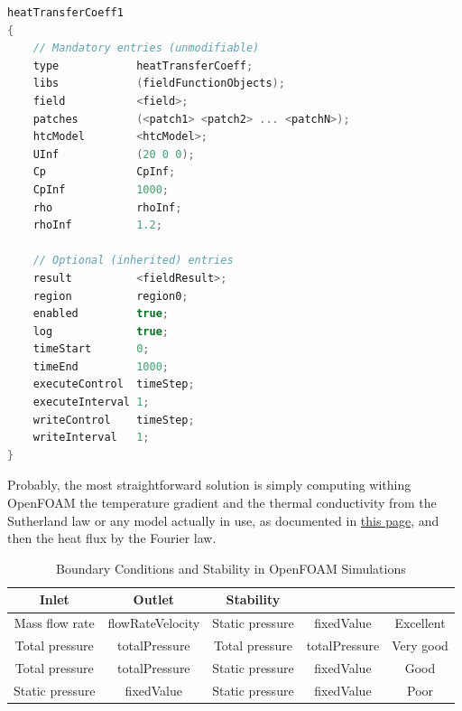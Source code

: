 \documentclass[12pt]{article}
\begin{document}
\begin{lstlisting}[caption={heatTransferCoeff1 Configuration.}, label={lst:heatTransferCoeff1}, language=C++]
heatTransferCoeff1
{
    // Mandatory entries (unmodifiable)
    type            heatTransferCoeff;
    libs            (fieldFunctionObjects);
    field           <field>;
    patches         (<patch1> <patch2> ... <patchN>);
    htcModel        <htcModel>;
    UInf            (20 0 0);
    Cp              CpInf;
    CpInf           1000;
    rho             rhoInf;
    rhoInf          1.2;

    // Optional (inherited) entries
    result          <fieldResult>;
    region          region0;
    enabled         true;
    log             true;
    timeStart       0;
    timeEnd         1000;
    executeControl  timeStep;
    executeInterval 1;
    writeControl    timeStep;
    writeInterval   1;
}
\end{lstlisting}

Probably, the most straightforward solution is simply computing withing OpenFOAM the temperature gradient and the thermal conductivity from the Sutherland law or any model actually in use, as documented in \href{https://www.openfoam.com/documentation/user-guide/5-models-and-physical-properties/5.2-thermophysical-models}{this page}, and then the heat flux by the Fourier law.

\begin{table}[H]
    \centering
    \begin{tabular}{ccccc}
        \hline
        \textbf{Inlet} & \textbf{Outlet} & \textbf{Stability} \\ \hline
        Mass flow rate & flowRateVelocity & Static pressure & fixedValue & Excellent \\ \hline
        Total pressure & totalPressure & Total pressure & totalPressure & Very good \\ \hline
        Total pressure & totalPressure & Static pressure & fixedValue & Good \\ \hline
        Static pressure & fixedValue & Static pressure & fixedValue & Poor \\ \hline
    \end{tabular}
    \caption{Boundary Conditions and Stability in OpenFOAM Simulations}
    \label{tab:boundary_conditions}
\end{table}
\end{document}
